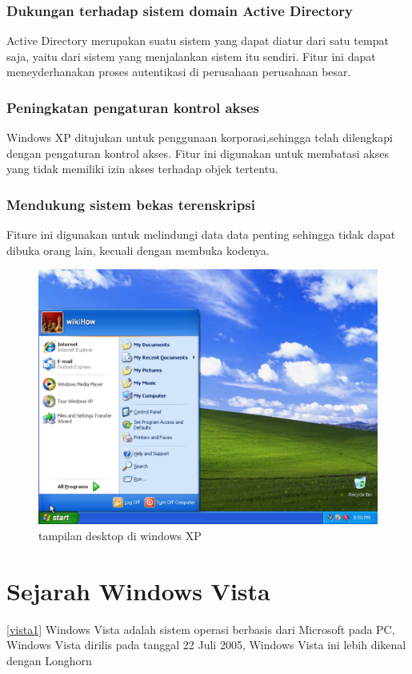 			\subsubsection{Dukungan terhadap sistem domain Active Directory} 
				Active Directory merupakan suatu sistem yang dapat diatur dari satu tempat saja, yaitu dari sistem yang menjalankan sistem itu sendiri. Fitur ini dapat meneyderhanakan 	proses autentikasi di perusahaan perusahaan besar.
			\subsubsection{Peningkatan pengaturan kontrol akses}
				Windows XP ditujukan untuk penggunaan korporasi,sehingga telah dilengkapi dengan pengaturan kontrol akses. Fitur ini digunakan untuk membatasi akses yang tidak memiliki izin akses terhadap objek tertentu.
			\subsubsection{Mendukung sistem bekas terenskripsi}
				Fiture ini digunakan untuk melindungi data data penting sehingga tidak dapat dibuka orang lain, kecuali dengan membuka kodenya.

\begin{figure}[ht]
\centerline{\includegraphics[width=1\textwidth]{figures/windowsxp.JPG}}
\caption{tampilan desktop di windows XP}
\label{windowsxp}
\end{figure}
	\section{Sejarah Windows Vista}
\ref{vista1}
		Windows Vista adalah sistem operasi berbasis dari Microsoft pada PC, Windows Vista dirilis pada tanggal 22 Juli 2005, Windows Vista ini lebih dikenal dengan Longhorn
